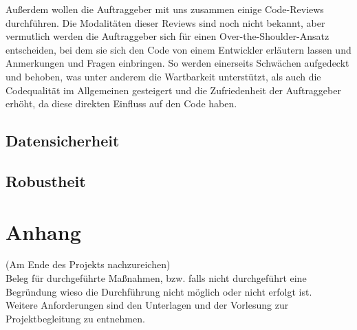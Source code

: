 \documentclass[accentcolor=tud0b,12pt,paper=a4]{tudreport}
\begin{document}
                Außerdem wollen die Auftraggeber mit uns zusammen einige Code-Reviews durchführen. Die Modalitäten dieser Reviews sind noch nicht bekannt, aber vermutlich werden die Auftraggeber sich für einen Over-the-Shoulder-Ansatz entscheiden, bei dem sie sich den Code von einem Entwickler erläutern lassen und Anmerkungen und Fragen einbringen. So werden einerseits Schwächen aufgedeckt und behoben, was unter anderem die Wartbarkeit unterstützt, als auch die Codequalität im Allgemeinen gesteigert und die Zufriedenheit der Auftraggeber erhöht, da diese direkten Einfluss auf den Code haben.

                \newpage
        \section{Datensicherheit}

        \section{Robustheit}

\appendix
	\chapter{Anhang}
		(Am Ende des Projekts nachzureichen)\\
		Beleg für durchgeführte Maßnahmen, bzw. falls nicht durchgeführt eine Begründung wieso die Durchführung nicht möglich oder nicht erfolgt ist. \\
		Weitere Anforderungen sind den Unterlagen und der Vorlesung zur Projektbegleitung zu entnehmen.
\end{document}
